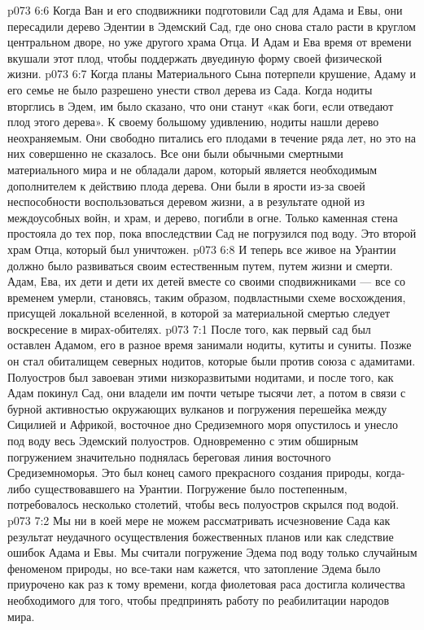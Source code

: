 \vs p073 6:6 Когда Ван и его сподвижники подготовили Сад для Адама и Евы, они пересадили дерево Эдентии в Эдемский Сад, где оно снова стало расти в круглом центральном дворе, но уже другого храма Отца. И Адам и Ева время от времени вкушали этот плод, чтобы поддержать двуединую форму своей физической жизни.
\vs p073 6:7 \pc Когда планы Материального Сына потерпели крушение, Адаму и его семье не было разрешено унести ствол дерева из Сада. Когда нодиты вторглись в Эдем, им было сказано, что они станут «как боги, если отведают плод этого дерева». К своему большому удивлению, нодиты нашли дерево неохраняемым. Они свободно питались его плодами в течение ряда лет, но это на них совершенно не сказалось. Все они были обычными смертными материального мира и не обладали даром, который является необходимым дополнителем к действию плода дерева. Они были в ярости из\hyp{}за своей неспособности воспользоваться деревом жизни, а в результате одной из междоусобных войн, и храм, и дерево, погибли в огне. Только каменная стена простояла до тех пор, пока впоследствии Сад не погрузился под воду. Это второй храм Отца, который был уничтожен.
\vs p073 6:8 И теперь все живое на Урантии должно было развиваться своим естественным путем, путем жизни и смерти. Адам, Ева, их дети и дети их детей вместе со своими сподвижниками --- все со временем умерли, становясь, таким образом, подвластными схеме восхождения, присущей локальной вселенной, в которой за материальной смертью следует воскресение в мирах\hyp{}обителях.
\vs p073 7:1 После того, как первый сад был оставлен Адамом, его в разное время занимали нодиты, кутиты и суниты. Позже он стал обиталищем северных нодитов, которые были против союза с адамитами. Полуостров был завоеван этими низкоразвитыми нодитами, и после того, как Адам покинул Сад, они владели им почти четыре тысячи лет, а потом в связи с бурной активностью окружающих вулканов и погружения перешейка между Сицилией и Африкой, восточное дно Средиземного моря опустилось и унесло под воду весь Эдемский полуостров. Одновременно с этим обширным погружением значительно поднялась береговая линия восточного Средиземноморья. Это был конец самого прекрасного создания природы, когда\hyp{}либо существовавшего на Урантии. Погружение было постепенным, потребовалось несколько столетий, чтобы весь полуостров скрылся под водой.
\vs p073 7:2 Мы ни в коей мере не можем рассматривать исчезновение Сада как результат неудачного осуществления божественных планов или как следствие ошибок Адама и Евы. Мы считали погружение Эдема под воду только случайным феноменом природы, но все\hyp{}таки нам кажется, что затопление Эдема было приурочено как раз к тому времени, когда фиолетовая раса достигла количества необходимого для того, чтобы предпринять работу по реабилитации народов мира.
